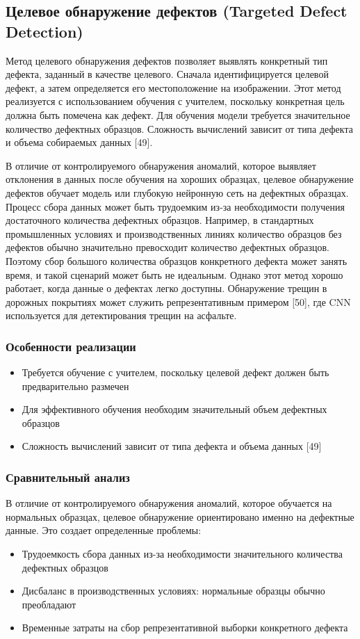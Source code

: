 \documentclass[14pt,a4paper]{article}
\begin{document}
\subsection{Целевое обнаружение дефектов (Targeted Defect Detection)}

Метод целевого обнаружения дефектов позволяет выявлять конкретный тип дефекта, заданный в качестве целевого. Сначала идентифицируется целевой дефект, а затем определяется его местоположение на изображении. Этот метод реализуется с использованием обучения с учителем, поскольку конкретная цель должна быть помечена как дефект. Для обучения модели требуется значительное количество дефектных образцов. Сложность вычислений зависит от типа дефекта и объема собираемых данных [49]. 

В отличие от контролируемого обнаружения аномалий, которое выявляет отклонения в данных после обучения на хороших образцах, целевое обнаружение дефектов обучает модель или глубокую нейронную сеть на дефектных образцах. Процесс сбора данных может быть трудоемким из-за необходимости получения достаточного количества дефектных образцов. Например, в стандартных промышленных условиях и производственных линиях количество образцов без дефектов обычно значительно превосходит количество дефектных образцов. Поэтому сбор большого количества образцов конкретного дефекта может занять время, и такой сценарий может быть не идеальным. Однако этот метод хорошо работает, когда данные о дефектах легко доступны. Обнаружение трещин в дорожных покрытиях может служить репрезентативным примером [50], где CNN используется для детектирования трещин на асфальте.

\subsubsection{Особенности реализации}
\begin{itemize}
	\item Требуется обучение с учителем, поскольку целевой дефект должен быть предварительно размечен
	\item Для эффективного обучения необходим значительный объем дефектных образцов
	\item Сложность вычислений зависит от типа дефекта и объема данных [49]
\end{itemize}

\subsubsection{Сравнительный анализ}
В отличие от контролируемого обнаружения аномалий, которое обучается на нормальных образцах, целевое обнаружение ориентировано именно на дефектные данные. Это создает определенные проблемы:
\begin{itemize}
	\item Трудоемкость сбора данных из-за необходимости значительного количества дефектных образцов
	\item Дисбаланс в производственных условиях: нормальные образцы обычно преобладают
	\item Временные затраты на сбор репрезентативной выборки конкретного дефекта
\end{itemize}
\end{document}

